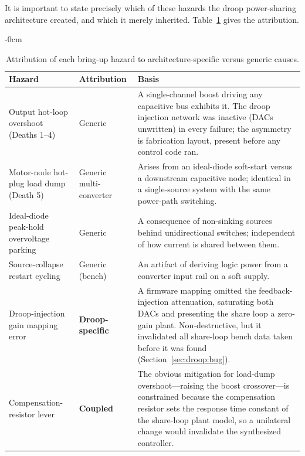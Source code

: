 
It is important to state precisely which of these hazards the droop power-sharing
architecture created, and which it merely inherited. Table~\ref{tab:droop-relevance}
gives the attribution.

\begin{table}[H]
\caption{Attribution of each bring-up hazard to architecture-specific versus generic causes.\label{tab:droop-relevance}}
\begin{adjustwidth}{-\extralength}{0cm}
\centering
\begin{tabular}{p{4.2cm}lp{7.5cm}}
\toprule
\textbf{Hazard} & \textbf{Attribution} & \textbf{Basis} \\
\midrule
Output hot-loop overshoot (Deaths 1--4) & Generic & A single-channel boost driving any capacitive bus exhibits it. The droop injection network was inactive (DACs unwritten) in every failure; the asymmetry is fabrication layout, present before any control code ran. \\
Motor-node hot-plug load dump (Death 5) & Generic multi-converter & Arises from an ideal-diode soft-start versus a downstream capacitive node; identical in a single-source system with the same power-path switching. \\
Ideal-diode peak-hold overvoltage parking & Generic & A consequence of non-sinking sources behind unidirectional switches; independent of how current is shared between them. \\
Source-collapse restart cycling & Generic (bench) & An artifact of deriving logic power from a converter input rail on a soft supply. \\
Droop-injection gain mapping error & \textbf{Droop-specific} & A firmware mapping omitted the feedback-injection attenuation, saturating both DACs and presenting the share loop a zero-gain plant. Non-destructive, but it invalidated all share-loop bench data taken before it was found (Section~\ref{sec:droop:bug}). \\
Compensation-resistor lever & \textbf{Coupled} & The obvious mitigation for load-dump overshoot---raising the boost crossover---is constrained because the compensation resistor sets the response time constant of the share-loop plant model, so a unilateral change would invalidate the synthesized controller. \\
\bottomrule
\end{tabular}
\end{adjustwidth}
\end{table}

